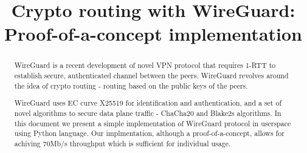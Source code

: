 \documentclass[conference,10pt,letter]{IEEEtran}
\begin{document}
\sloppy
\title{Crypto routing with WireGuard: Proof-of-a-concept implementation}
\maketitle
\begin{abstract}
WireGuard is a recent development of novel VPN protocol that 
requires 1-RTT to establish secure, authenticated channel between
the peers. WireGuard revolves around the idea of crypto routing 
- routing based on the public keys of the peers. 

WireGuard uses EC curve X25519 for identification and authentication,
and a set of novel algorithms to secure data plane traffic - ChaCha20 and Blake2s 
algorithms. In this document we present a simple implementation of WireGuard
protocol in userspace using Python language. Our implmentation, although
a proof-of-a-concept, allows for achiving 70Mb/s throughput which is sufficient
for individual usage.
\end{abstract}

% 
%

%

%
%
\end{document}
